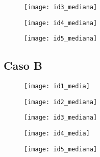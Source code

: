 \begin{figure}[!htbp]
  \texttt{[image: id3\_mediana]}
  \label{id3_mediana}
\end{figure}

\begin{figure}[!htbp]
  \texttt{[image: id4\_mediana]}
  \label{id4_mediana}
\end{figure}

\begin{figure}[!htbp]
  \texttt{[image: id5\_mediana]}
  \label{id5_mediana}
\end{figure}

\clearpage

\subsection{Caso B}

\begin{figure}[!htbp]
  \texttt{[image: id1\_media]}
  \label{id1_media}
\end{figure}


\begin{figure}[!htbp]
  \texttt{[image: id2\_mediana]}
  \label{id2_mediana}
\end{figure}


\begin{figure}[!htbp]
  \texttt{[image: id3\_mediana]}
  \label{id3_mediana}
\end{figure}

\begin{figure}[!htbp]
  \texttt{[image: id4\_media]}
  \label{id4_media}
\end{figure}

\begin{figure}[!htbp]
  \texttt{[image: id5\_mediana]}
  \label{id5_mediana}
\end{figure}
